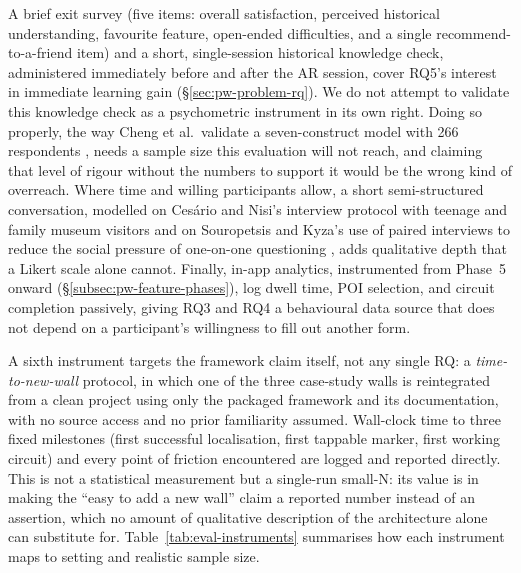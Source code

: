 \begin{aitemize}[nosep]
A brief exit survey (five items: overall satisfaction, perceived
historical understanding, favourite feature, open-ended difficulties, and
a single recommend-to-a-friend item) and a short, single-session
historical knowledge check, administered immediately before and after
the AR session, cover RQ5's interest in immediate learning gain
(\S\ref{sec:pw-problem-rq}). We do not attempt to validate this knowledge
check as a psychometric instrument in its own right. Doing so properly,
the way Cheng et al.\ validate a seven-construct model with 266
respondents \cite{cheng2025}, needs a sample size this evaluation will not
reach, and claiming that level of rigour without the numbers to support
it would be the wrong kind of overreach. Where time and willing
participants allow, a short semi-structured conversation, modelled on
Cesário and Nisi's interview protocol with teenage and family museum
visitors \cite{cesarionisi2023} and on Souropetsis and Kyza's use of
paired interviews to reduce the social pressure of one-on-one questioning
\cite{souropetsis2025}, adds qualitative depth that a Likert scale alone
cannot. Finally, in-app analytics, instrumented from Phase~5 onward
(\S\ref{subsec:pw-feature-phases}), log dwell time, POI selection, and
circuit completion passively, giving RQ3 and RQ4 a behavioural data
source that does not depend on a participant's willingness to fill out
another form.

A sixth instrument targets the framework claim itself, not any
single RQ: a \emph{time-to-new-wall} protocol, in which one of the three
case-study walls is reintegrated from a clean project using only the
packaged framework and its documentation, with no source access and no
prior familiarity assumed. Wall-clock time to three fixed milestones (first
successful localisation, first tappable marker, first working circuit)
and every point of friction encountered are logged and reported directly.
This is not a statistical measurement but a single-run small-N: its value is in making the ``easy to add a new wall''
claim a reported number instead of an assertion, which no amount of
qualitative description of the architecture alone can substitute for.
Table~\ref{tab:eval-instruments} summarises how each instrument maps to
setting and realistic sample size.
 

\end{aitemize}
